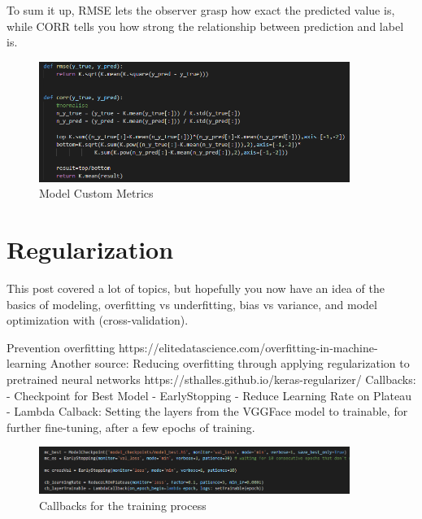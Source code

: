 To sum it up, RMSE lets the observer grasp how exact the predicted value is, while CORR tells you how strong the relationship between prediction and label is.

\begin{figure}[H]
  \begin{center}
  \includegraphics[angle=0, width=0.9\textwidth]{Figures/model_metrics.PNG}
  \caption{Model Custom Metrics}
  \label{fig:ModelCustomMetrics}
  \end{center}
\end{figure}

\section{Regularization}
This post covered a lot of topics, but hopefully you now have an idea of the basics of modeling, overfitting vs underfitting, bias vs variance, and model optimization with (cross-validation). \cite{Koehrsen:2018:OverfittingVSUnderfitting}

Prevention overfitting
https://elitedatascience.com/overfitting-in-machine-learning
\newline\newline
Another source:
Reducing overfitting through applying regularization to pretrained neural networks
https://sthalles.github.io/keras-regularizer/
\newline\newline
Callbacks: 
- Checkpoint for Best Model
- EarlyStopping
- Reduce Learning Rate on Plateau
- Lambda Calback: Setting the layers from the VGGFace model to trainable, for further fine-tuning, after a few epochs of training.

\begin{figure}[H]
  \begin{center}
  \includegraphics[angle=0, width=0.9\textwidth]{Figures/model_callbacks.PNG}
  \caption{Callbacks for the training process}
  \label{fig:CallbacksTraining}
  \end{center}
\end{figure}

